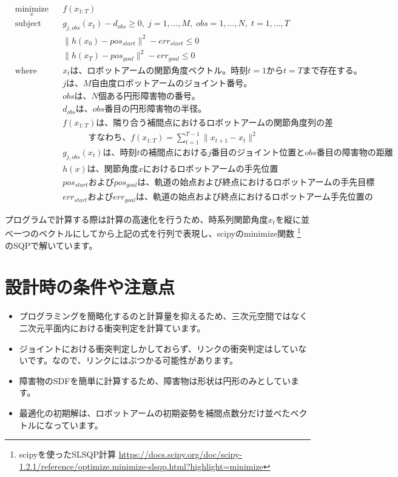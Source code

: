 \begin{equation*}
  \begin{aligned}
    & \underset{x}{\text{minimize}}
    & & f(x_{1:T}) \\
    & \text{subject to}
    & & g_{j,obs}(x_t) - d_{obs} \geq 0, \; j = 1, \ldots, M, \; obs = 1, \ldots, N, \; t = 1, \ldots, T \\
    & \text{}
    & & \|h(x_0) - pos_{start}\|^2 - err_{start} \leq 0 \\
    & \text{}
    & & \|h(x_T) - pos_{goal}\|^2 - err_{goal} \leq 0 \\
    & \text{where}
    & & x_t\text{は、ロボットアームの関節角度ベクトル。時刻}t=1\text{から}t=T\text{まで存在する。} \\
    & \text{}
    & & j\text{は、}M\text{自由度ロボットアームのジョイント番号。} \\
    & \text{}
    & & obs\text{は、}N\text{個ある円形障害物の番号。} \\
    & \text{}
    & & d_{obs}\text{は、}obs\text{番目の円形障害物の半径。} \\
    & \text{}
    & & f(x_{1:T})\text{は、隣り合う補間点におけるロボットアームの関節角度列の差分の二乗和} \\
    & \text{}
    & & \text{　　　すなわち、}f(x_{1:T}) = \sum_{t=1}^{T-1} \|x_{t+1} - x_t\|^2 \\
    & \text{}
    & & g_{j,obs}(x_t)\text{は、時刻}t{の補間点における}j\text{番目のジョイント位置と}obs\text{番目の障害物の距離} \\
    & \text{}
    & & h(x)\text{は、関節角度}x\text{におけるロボットアームの手先位置} \\
    & \text{}
    & & pos_{start}\text{および}pos_{goal}\text{は、軌道の始点および終点におけるロボットアームの手先目標位置} \\
    & \text{}
    & & err_{start}\text{および}err_{goal}\text{は、軌道の始点および終点におけるロボットアーム手先位置の許容誤差}
  \end{aligned}
\end{equation*}

プログラムで計算する際は計算の高速化を行うため、時系列関節角度$x_t$を縦に並べ一つのベクトルにしてから上記の式を行列で表現し、scipyのminimize関数
\footnote{scipyを使ったSLSQP計算 \url{https://docs.scipy.org/doc/scipy-1.2.1/reference/optimize.minimize-slsqp.html?highlight=minimize}}
のSQPで解いています。

\section{設計時の条件や注意点}
\begin{itemize}
  \item プログラミングを簡略化するのと計算量を抑えるため、三次元空間ではなく二次元平面内における衝突判定を計算ています。
  \item ジョイントにおける衝突判定しかしておらず、リンクの衝突判定はしていないです。なので、リンクにはぶつかる可能性があります。
  \item 障害物のSDFを簡単に計算するため、障害物は形状は円形のみとしています。
  \item 最適化の初期解は、ロボットアームの初期姿勢を補間点数分だけ並べたベクトルになっています。
\end{itemize}
